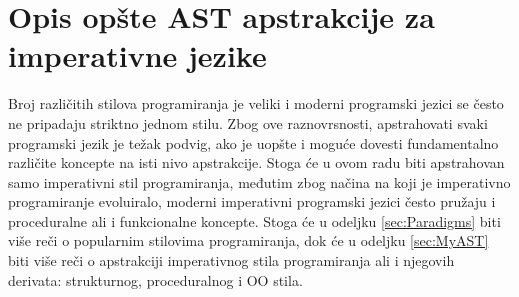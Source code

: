 \chapter{Opis opšte AST apstrakcije za imperativne jezike}
\label{chp:MyAST}

Broj različitih stilova programiranja je veliki i moderni programski jezici se često ne pripadaju striktno jednom stilu. Zbog ove raznovrsnosti, apstrahovati svaki programski jezik je težak podvig, ako je uopšte i moguće dovesti fundamentalno različite koncepte na isti nivo apstrakcije. Stoga će u ovom radu biti apstrahovan samo imperativni stil programiranja, međutim zbog načina na koji je imperativno programiranje evoluiralo, moderni imperativni programski jezici često pružaju i proceduralne ali i funkcionalne koncepte. Stoga će u odeljku \ref{sec:Paradigms} biti više reči o popularnim stilovima programiranja, dok će u odeljku \ref{sec:MyAST} biti više reči o apstrakciji imperativnog stila programiranja ali i njegovih derivata: strukturnog, proceduralnog i OO stila.



